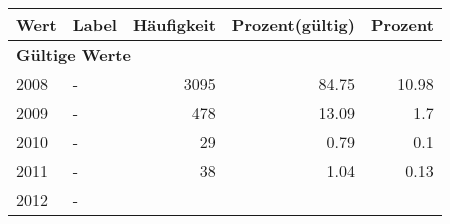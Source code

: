      \begin{longtable}{lXrrr}
     \toprule
     \textbf{Wert} & \textbf{Label} & \textbf{Häufigkeit} & \textbf{Prozent(gültig)} & \textbf{Prozent} \\
     \endhead
     \midrule
     \multicolumn{5}{l}{\textbf{Gültige Werte}}\\

     2008 &
     \multicolumn{1}{X}{ -  } &


       \num{3095} &
       \num[round-mode=places,round-precision=2]{84,75} &
         \num[round-mode=places,round-precision=2]{10,98} \\

     2009 &
     \multicolumn{1}{X}{ -  } &


       \num{478} &
       \num[round-mode=places,round-precision=2]{13,09} &
         \num[round-mode=places,round-precision=2]{1,7} \\

     2010 &
     \multicolumn{1}{X}{ -  } &


       \num{29} &
       \num[round-mode=places,round-precision=2]{0,79} &
         \num[round-mode=places,round-precision=2]{0,1} \\

     2011 &
     \multicolumn{1}{X}{ -  } &


       \num{38} &
       \num[round-mode=places,round-precision=2]{1,04} &
         \num[round-mode=places,round-precision=2]{0,13} \\

     2012 &
     \multicolumn{1}{X}{ -  } &



\end{longtable}
